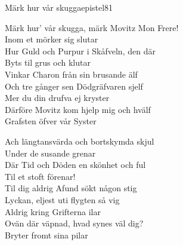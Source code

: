 \begin{song}{Märk hur vår skugga}{epistel81}
\begin{vers}
Märk hur' vår skugga, märk Movitz Mon Frere!\\
Inom et mörker sig slutar\\
Hur Guld och Purpur i Skåfveln, den där\\
Byts til grus och klutar\\
Vinkar Charon från sin brusande älf\\
Och tre gånger sen Dödgräfvaren sjelf\\
Mer du din drufva ej kryster\\
Därföre Movitz kom hjelp mig och hvälf\\
Grafsten öfver vår Syster\\
\end{vers}
\begin{vers}
Ach längtansvärda och bortskymda skjul\\
Under de susande grenar\\
Där Tid och Döden en skönhet och ful\\
Til et stoft förenar!\\
Til dig aldrig Afund sökt någon stig\\
Lyckan, eljest uti flygten så vig\\
Aldrig kring Grifterna ilar\\
Ovän där väpnad, hvad synes väl dig?\\
Bryter fromt sina pilar\\
\end{vers}

\newp


\end{song}

